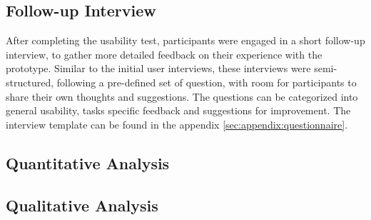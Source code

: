 \subsection{Follow-up Interview}
\label{sec:methodology:study:interview}

After completing the usability test, participants were engaged in a short follow-up interview, to gather more detailed feedback on their experience with the prototype. 
Similar to the initial user interviews, these interviews were semi-structured, following a pre-defined set of question, with room for participants to share their own thoughts and suggestions.
The questions can be categorized into general usability, tasks specific feedback and suggestions for improvement.
The interview template can be found in the appendix \ref{sec:appendix:questionnaire}.


\subsection{Quantitative Analysis}
\label{sec:methodology:study:quantitative}

\subsection{Qualitative Analysis}
\label{sec:methodology:study:qualitative}

